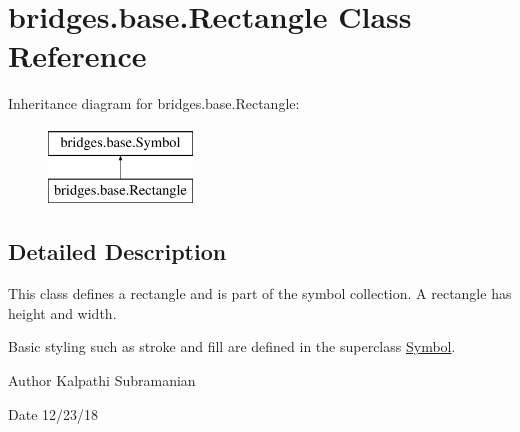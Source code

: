 \hypertarget{classbridges_1_1base_1_1_rectangle}{}\section{bridges.\+base.\+Rectangle Class Reference}
\label{classbridges_1_1base_1_1_rectangle}
Inheritance diagram for bridges.\+base.\+Rectangle\+:\begin{figure}[H]
\begin{center}
\leavevmode
\includegraphics[height=2.000000cm]{classbridges_1_1base_1_1_rectangle}
\end{center}
\end{figure}


\subsection{Detailed Description}
This class defines a rectangle and is part of the symbol collection. A rectangle has height and width. 

Basic styling such as stroke and fill are defined in the superclass \mbox{\hyperlink{classbridges_1_1base_1_1_symbol}{Symbol}}.

\begin{DoxyAuthor}{Author}
Kalpathi Subramanian 
\end{DoxyAuthor}
\begin{DoxyDate}{Date}
12/23/18 
\end{DoxyDate}
